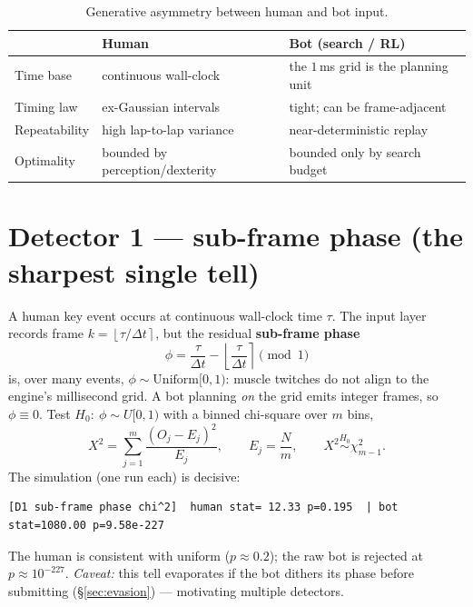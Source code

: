 \documentclass[11pt]{article}
\newcommand{\round}[1]{\left\lfloor #1 \right\rceil}
\begin{document}
\begin{table}[h]
\centering
\caption{Generative asymmetry between human and bot input.}
\label{tab:asym}
\begin{tabular}{lll}
\toprule
 & \textbf{Human} & \textbf{Bot (search / RL)} \\
\midrule
Time base    & continuous wall-clock        & the $1$\,ms grid is the planning unit \\
Timing law   & ex-Gaussian intervals        & tight; can be frame-adjacent \\
Repeatability& high lap-to-lap variance     & near-deterministic replay \\
Optimality   & bounded by perception/dexterity & bounded only by search budget \\
\bottomrule
\end{tabular}
\end{table}

\section{Detector 1 --- sub-frame phase (the sharpest single tell)}

A human key event occurs at continuous wall-clock time $\tau$. The input layer
records frame $k=\round{\tau/\Delta t}$, but the residual \textbf{sub-frame
phase}
\begin{equation}
\phi = \frac{\tau}{\Delta t} - \round{\frac{\tau}{\Delta t}} \pmod 1
\end{equation}
is, over many events, $\phi \sim \mathrm{Uniform}[0,1)$: muscle twitches do not
align to the engine's millisecond grid. A bot planning \emph{on} the grid emits
integer frames, so $\phi \equiv 0$. Test $H_0:\ \phi\sim U[0,1)$ with a binned
chi-square over $m$ bins,
\begin{equation}
X^2 = \sum_{j=1}^{m} \frac{(O_j - E_j)^2}{E_j}, \qquad E_j = \frac{N}{m},
\qquad X^2 \overset{H_0}{\sim} \chi^2_{m-1}.
\end{equation}
The simulation (one run each) is decisive:
\begin{lstlisting}[style=out]
[D1 sub-frame phase chi^2]  human stat= 12.33 p=0.195  | bot stat=1080.00 p=9.58e-227
\end{lstlisting}
The human is consistent with uniform ($p\approx0.2$); the raw bot is rejected at
$p\approx10^{-227}$. \emph{Caveat:} this tell evaporates if the bot dithers its
phase before submitting (\S\ref{sec:evasion}) --- motivating multiple detectors.
\end{document}
